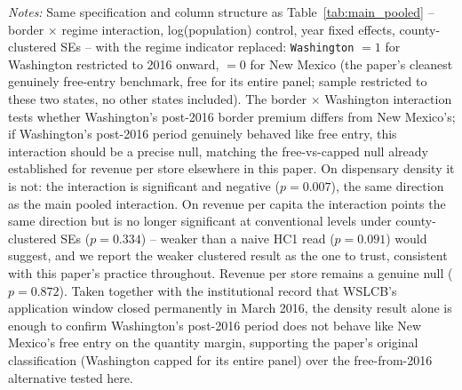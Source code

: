 \begin{table}[htbp]
\centering
\caption{Robustness check: Washington (2016 onward) vs.\ New Mexico, same specification as Table~\ref{tab:main_pooled}}
\label{tab:wa_vs_nm}
\footnotesize
{}
\begin{minipage}{0.98\textwidth}
\vspace{0.3em}
\footnotesize
\textit{Notes:} Same specification and column structure as Table~\ref{tab:main_pooled} -- border $\times$
regime interaction, log(population) control, year fixed effects, county-clustered SEs -- with the regime
indicator replaced: \texttt{Washington} $=1$ for Washington restricted to 2016 onward, $=0$ for New Mexico
(the paper's cleanest genuinely free-entry benchmark, free for its entire panel; sample restricted to these
two states, no other states included). The border $\times$ Washington interaction tests whether Washington's
post-2016 border premium differs from New Mexico's; if Washington's post-2016 period genuinely behaved like
free entry, this interaction should be a precise null, matching the free-vs-capped null already established
for revenue per store elsewhere in this paper. On dispensary density it is not: the interaction is
significant and negative ($p=0.007$), the same direction as the main pooled interaction. On revenue per
capita the interaction points the same direction but is no longer significant at conventional levels under
county-clustered SEs ($p=0.334$) -- weaker than a naive HC1 read ($p=0.091$) would suggest, and we report the
weaker clustered result as the one to trust, consistent with this paper's practice throughout. Revenue per
store remains a genuine null ($p=0.872$). Taken together with the institutional record that WSLCB's
application window closed permanently in March 2016, the density result alone is enough to confirm
Washington's post-2016 period does not behave like New Mexico's free entry on the quantity margin, supporting
the paper's original classification (Washington capped for its entire panel) over the free-from-2016
alternative tested here.
\end{minipage}
\end{table}
